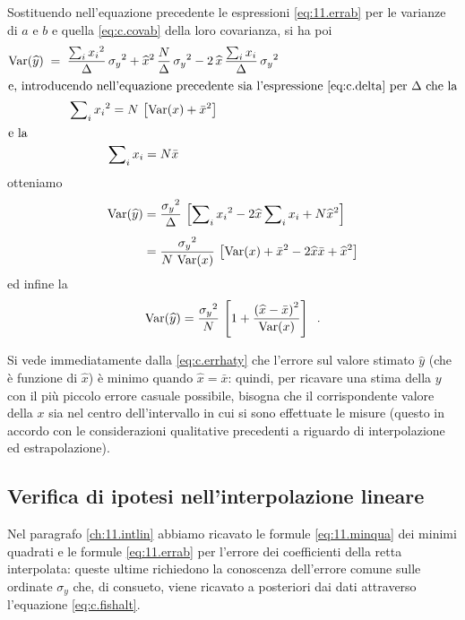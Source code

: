 Sostituendo nell'equazione precedente le espressioni
\eqref{eq:11.errab} per le varianze di $a$ e $b$ e quella
\eqref{eq:c.covab} della loro covarianza, si ha poi
\begin{gather*}
  \operatorname{Var}(\widehat y) \; = \; \frac{\sum\nolimits_i {x_i}^2}
  {\Delta} \, {\sigma_y}^2 + {\widehat x}^2 \,
    \frac{N}{\Delta} \, {\sigma_y}^2 - 2 \, \widehat x \,
    \frac{\sum\nolimits_i x_i}{\Delta} \, {\sigma_y}^2 \\
  \intertext{e, introducendo nell'equazione precedente sia
    l'espressione \eqref{eq:c.delta} per $\Delta$ che la}
  \sum\nolimits_i {x_i}^2 = N \, \left[ \operatorname{Var}(x) + \bar x^2
    \right] \\
  \intertext{e la}
  \sum\nolimits_i x_i = N \bar x
\end{gather*}
otteniamo
\begin{align*}
  \operatorname{Var}(\widehat y) &= \frac{{\sigma_y}^2}{\Delta} \, \left[
    \sum\nolimits_i {x_i}^2 - 2 \widehat x \sum\nolimits_i
    x_i + N {\widehat x}^2 \right] \\[1ex]
  &= \frac{{\sigma_y}^2}{N \, \operatorname{Var}(x)} \, \left[ \operatorname{Var}(x) +
    \bar x^2 - 2 \widehat x \bar x + {\widehat x}^2 \right]
\end{align*}
ed infine la
\begin{equation} \label{eq:c.errhaty}
  \operatorname{Var}(\widehat y) = \frac{{\sigma_y}^2}{N} \, \left[ 1 +
    \frac{\left( \widehat x - \bar x \right)^2}{\operatorname{Var}(x)}
  \right] \;\; .
\end{equation}

Si vede immediatamente dalla \eqref{eq:c.errhaty} che
l'errore sul valore stimato $\widehat y$ (che \`e funzione
di $\widehat x$) \`e minimo quando $\widehat x = \bar x$:
quindi, per ricavare una stima della $y$ con il pi\`u
piccolo errore casuale possibile, bisogna che il
corrispondente valore della $x$ sia nel centro
dell'intervallo in cui si sono effettuate le misure (questo
in accordo con le considerazioni qualitative precedenti a
riguardo di interpolazione ed estrapolazione).

\subsection{Verifica di ipotesi nell'interpolazione lineare}
Nel paragrafo \ref{ch:11.intlin} abbiamo ricavato le formule
\eqref{eq:11.minqua} dei minimi quadrati e le formule
\eqref{eq:11.errab} per l'errore dei coefficienti della
retta interpolata: queste ultime richiedono la conoscenza
dell'errore comune sulle ordinate $\sigma_y$ che, di
consueto, viene ricavato a posteriori dai dati attraverso
l'equazione \eqref{eq:c.fishalt}.

